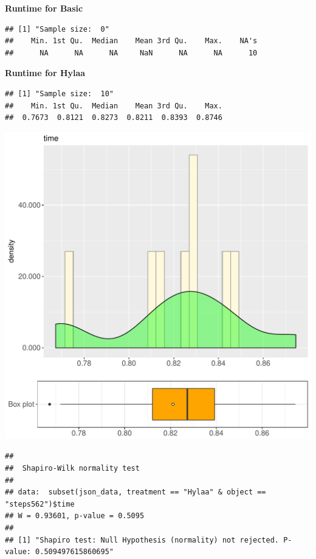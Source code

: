 \documentclass{article}\usepackage[]{graphicx}\usepackage[]{color}
\makeatletter
\def\maxwidth{ %
  \ifdim\Gin@nat@width>\linewidth
    \linewidth
  \else
    \Gin@nat@width
  \fi
}
\newenvironment{kframe}{%
 \def\at@end@of@kframe{}%
 \ifinner\ifhmode%
  \def\at@end@of@kframe{\end{minipage}}%
  \begin{minipage}{\columnwidth}%
 \fi\fi%
 \def\FrameCommand##1{\hskip\@totalleftmargin \hskip-\fboxsep
 \colorbox{shadecolor}{##1}\hskip-\fboxsep
     \hskip-\linewidth \hskip-\@totalleftmargin \hskip\columnwidth}%
 \MakeFramed {\advance\hsize-\width
   \@totalleftmargin\z@ \linewidth\hsize
   \@setminipage}}%
 {\par\unskip\endMakeFramed%
 \at@end@of@kframe}
\newenvironment{knitrout}{}{} %
\makeatother
\begin{document}
 \textbf{Runtime for Basic}
\begin{knitrout}
\color{fgcolor}\begin{kframe}
\begin{verbatim}
## [1] "Sample size:  0"
##    Min. 1st Qu.  Median    Mean 3rd Qu.    Max.    NA's 
##      NA      NA      NA     NaN      NA      NA      10
\end{verbatim}
\end{kframe}
\end{knitrout}
 \textbf{Runtime for Hylaa}
\begin{knitrout}
\color{fgcolor}\begin{kframe}
\begin{verbatim}
## [1] "Sample size:  10"
##    Min. 1st Qu.  Median    Mean 3rd Qu.    Max. 
##  0.7673  0.8121  0.8273  0.8211  0.8393  0.8746
\end{verbatim}
\end{kframe}
\includegraphics[width=\maxwidth]{figure/RH3_Hylaa_steps562-1} 
\begin{kframe}\begin{verbatim}
## 
## 	Shapiro-Wilk normality test
## 
## data:  subset(json_data, treatment == "Hylaa" & object == "steps562")$time
## W = 0.93601, p-value = 0.5095
## 
## [1] "Shapiro test: Null Hypothesis (normality) not rejected. P-value: 0.509497615860695"
\end{verbatim}
\end{kframe}
\end{knitrout}
  
\end{document}

